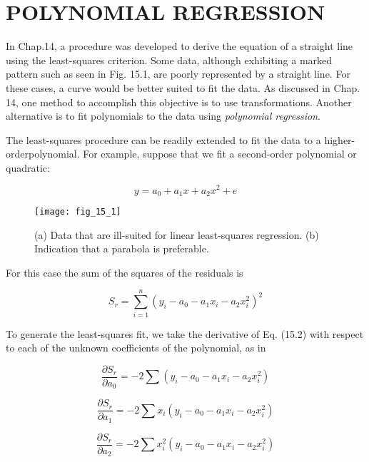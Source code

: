 \documentclass[../main.tex]{subfiles}
\begin{document}
\label{cha:cha_P_15_1}
\section{POLYNOMIAL REGRESSION}
\noindent In Chap.14, a procedure was developed to derive the equation of a straight line using the least-squares criterion. Some data, although exhibiting a marked pattern such as seen in Fig. 15.1, are poorly represented by a straight line. For these cases, a curve would be better suited to fit the data. As discussed in Chap. 14, one method to accomplish this objective is to use transformations. Another alternative is to fit polynomials to the data using \emph{polynomial regression}.

The least-squares procedure can be readily extended to fit the data to a higher-orderpolynomial. For example,  suppose that we fit a second-order polynomial or quadratic:

\begin{equation}
	\tag{15.1}
	y = a_0 + a_1x + a_2x^2 + e
\end{equation}

\begin{wrapfigure}{l}{0.25\textwidth}
    \centering
    \texttt{[image: fig\_15\_1]}
   \caption{\textsf{(a) Data that are ill-suited for linear least-squares regression. (b) Indication that a parabola is preferable.}}
   \label{fig:fig_15_1}
\end{wrapfigure}

\noindent For this case the sum of the squares of the residuals is

\begin{equation}
	\tag{15.2}
	S_r = \sum^n_{i=1}(y_i - a_0 - a_1x_i - a_2x^2_i)^2
\end{equation}

To generate the least-squares fit, we take the derivative of Eq. (15.2) with respect to each of the unknown coefficients of the polynomial, as in

\begin{equation}
	\frac{\partial S_r}{\partial a_0} = -2 \sum (y_i -a_0 -a_1x_i - a_2x_i^2)
\end{equation}

\begin{equation}
	\frac{\partial S_r}{\partial a_1} = -2 \sum x_i (y_i -a_0 -a_1x_i - a_2x_i^2)
\end{equation}

\begin{equation}
	\frac{\partial S_r}{\partial a_2} = -2 \sum x_i^2 (y_i -a_0 -a_1x_i - a_2x_i^2)
\end{equation}
\end{document}
